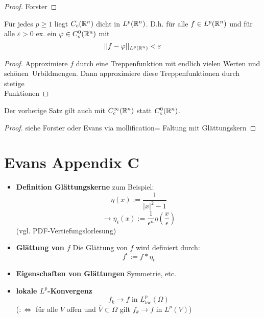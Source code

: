 \begin{proof}
	Forster
\end{proof}

\begin{satz} \enter
	Für jedes $p \geq 1$ liegt $C_c(\mathbb{R}^n)$ dicht in $L^p(\mathbb{R}^n)$. \enter
	D.h. für alle $f \in L^p(\mathbb{R}^n)$ und für alle $\varepsilon > 0$ ex. ein
	$\varphi \in C^0_c(\mathbb{R}^n)$ mit 
	\[||f-\varphi||_{ L^p(\mathbb{R}^n)} < \varepsilon\]
\end{satz}

\begin{proof}
Approximiere $f$ durch eine Treppenfunktion mit endlich vielen Werten und \glqq sch\"onen\grqq\ Urbildmengen. Dann approximiere diese Treppenfunktionen durch stetige\\ Funktionen
\end{proof}

\begin{satz}\enter
	Der vorherige Satz gilt auch mit $C^\infty_c(\mathbb{R}^n)$ statt $C^0_c(\mathbb{R}^n)$.
\end{satz}

\begin{proof}
	siehe Forster oder Evans via \glqq mollification\grqq = Faltung mit Glättungskern
\end{proof}


\section{Evans Appendix C}

\begin{itemize}
	\item \textbf{Definition Glättungskerne} \enter
		zum Beispiel:
		\[\eta(x):= \frac{1}{|x|^2-1}\]
		\[\rightarrow \eta_\epsilon(x):=\frac{1}{\epsilon^n}\eta\left(\frac{x}{\epsilon}\right)\]
			(vgl. PDF-Vertiefungslorlesung)
		\item \textbf{Glättung von $f$} \enter
			Die Glättung von $f$ wird definiert durch:
			\[f^\epsilon:=f\ast\eta_\epsilon\]
		\item \textbf{Eigenschaften von Glättungen}\enter
			Symmetrie, etc.
		\item \textbf{lokale $L^p$-Konvergenz}
			\[f_k \rightarrow f \text{ in } L^p_{loc}(\Omega)\]
			($:\iff$ für alle $V$ offen und $\overline{V}\subset\Omega$ gilt
				$f_k\rightarrow f \text{ in } L^p(V)$)
\end{itemize}
